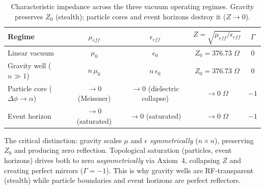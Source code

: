 \begin{table}[H]
\centering
\caption{Characteristic impedance across the three vacuum operating regimes. Gravity preserves $Z_0$ (stealth); particle cores and event horizons destroy it ($Z \to 0$).}
\label{tab:impedance_regimes}
\small
\begin{tabular}{@{}l c c c c@{}}
\toprule
\textbf{Regime} & $\mu_{eff}$ & $\epsilon_{eff}$ & $Z = \sqrt{\mu_{eff}/\epsilon_{eff}}$ & $\Gamma$ \\
\midrule
Linear vacuum             & $\mu_0$                & $\epsilon_0$                & $Z_0 = 376.73\;\Omega$  & $0$ \\
Gravity well ($n \gg 1$)  & $n\, \mu_0$            & $n\, \epsilon_0$            & $Z_0 = 376.73\;\Omega$  & $0$ \\
Particle core ($\Delta\phi \to \alpha$) & $\to 0$ (Meissner) & $\to 0$ (dielectric collapse) & $\to 0\;\Omega$ & $-1$ \\
Event horizon             & $\to 0$ (saturated)    & $\to 0$ (saturated)         & $\to 0\;\Omega$          & $-1$ \\
\bottomrule
\end{tabular}
\end{table}

\noindent The critical distinction: gravity scales $\mu$ and $\epsilon$ \textit{symmetrically} ($n \times n$), preserving $Z_0$ and producing zero reflection. Topological saturation (particles, event horizons) drives both to zero \textit{asymmetrically} via Axiom~4, collapsing $Z$ and creating perfect mirrors ($\Gamma = -1$). This is why gravity wells are RF-transparent (stealth) while particle boundaries and event horizons are perfect reflectors.
